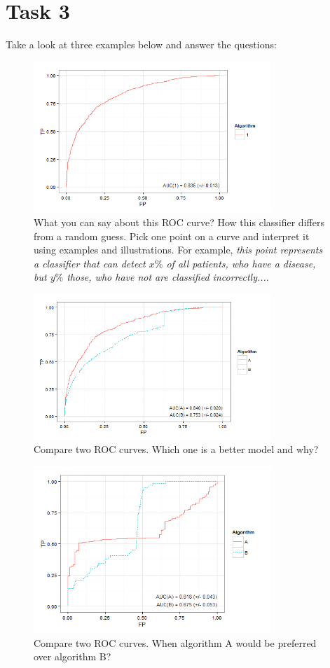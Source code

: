 \documentclass{article}
\begin{document}
\section*{Task 3}
Take a look at three examples below and answer the questions:
\begin{figure}[h!]
  \centering
      \includegraphics[width=0.8\textwidth]{plot1}
  \caption{What you can say about this ROC curve? How this classifier differs from a random guess. Pick one point on a curve and interpret it using examples and illustrations. For example, \emph{this point represents a classifier that can detect $x\%$ of all patients, who have a disease, but $y\%$ those, who have not are classified incorrectly...}.}
\end{figure}
\begin{figure}[h!]
  \centering
      \includegraphics[width=0.8\textwidth]{plot2}
  \caption{Compare two ROC curves. Which one is a better model and why?}
\end{figure}
\begin{figure}[H]
  \centering
      \includegraphics[width=0.8\textwidth]{plot3}
  \caption{Compare two ROC curves. When algorithm A would be preferred over algorithm B?}
\end{figure}
\end{document}
